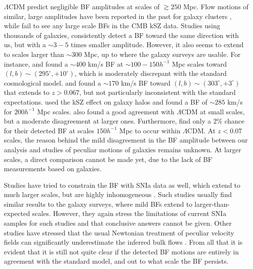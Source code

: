 \documentclass{aa}   %
\begin{document}
$\Lambda$CDM predict negligible BF amplitudes at scales of $\gtrsim 250$ Mpc. Flow motions of similar, large amplitudes have been reported in the past for galaxy clusters \citep[e.g.,][]{lauer,hudson99,kashl08,kashl10,atrio-bar}, while \citet{osborne,mody,planck14} fail to see any large scale BFs in the CMB kSZ data. Studies using thousands of galaxies, consistently detect a BF toward the same direction with us, but with a $\sim 3-5$ times smaller amplitude. However, it also seems to extend to scales larger than $\sim 300$ Mpc, up to where the galaxy surveys are usable. For instance, \citet{watkins} and \citet{magoulas} found a $\sim 400$ km/s BF at $\sim 100-150 h^{-1}$ Mpc scales toward $(l,b)\sim (295^{\circ},+10^{\circ})$, which is moderately discrepant with the standard cosmological model. \citet{carrick} and \citet{boruah} found a $\sim 170$ km/s BF toward $(l,b)\sim (303^{\circ},+3^{\circ})$ that extends to $z>0.067$, but not particularly inconsistent with the standard expectations. \citet{lavaux} used the kSZ effect on galaxy halos and found a BF of $\sim 285$ km/s for $200h^{-1}$ Mpc scales. \citet{watkins2} also found a good agreement with $\Lambda$CDM at small scales, but a moderate disagreement at larger ones. Furthermore, \citet{peery} find only a $2\%$ chance for their detected BF at scales $150h^{-1}$ Mpc to occur within $\Lambda$CDM. At $z<0.07$ scales, the reason behind the mild disagreement in the BF amplitude between our analysis and studies of peculiar motions of galaxies remains unknown. At larger scales, a direct comparison cannot be made yet, due to the lack of BF measurements based on galaxies.

Studies have tried to constrain the BF with SNIa data as well, which extend to much larger scales, but are highly inhomogeneous \citep[][and references therein]{colin2011,feindt,appleby-john,mathews,salehi2}. Such studies usually find similar results to the galaxy surveys, where mild BFs extend to larger-than-expected scales. However, they again stress the limitations of current SNIa samples for such studies and that conclusive answers cannot be given. Other studies have stressed that the usual Newtonian treatment of peculiar velocity fields can significantly underestimate the inferred bulk flows \citep[e.g.,][]{tsagas,tsaprazi}. From all that it is evident that it is still not quite clear if the detected BF motions are entirely in agreement with the standard model, and out to what scale the BF persists. 
\end{document}
